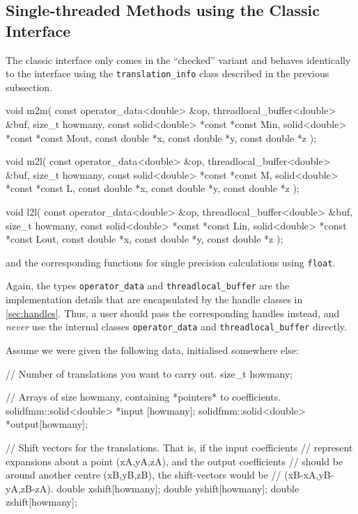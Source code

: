 \documentclass{scrbook}
\begin{document}
\subsection{Single-threaded Methods using the Classic Interface}
The classic interface only comes in the \enquote{checked} variant and behaves
identically to the interface using the \lstinline|translation_info| class
described in the previous subsection.
\begin{cppcode*}
void m2m( const operator_data<double> &op, threadlocal_buffer<double> &buf, 
          size_t howmany, const solid<double> *const *const Min,
                                solid<double> *const *const Mout,
          const double *x, const double *y, const double *z );

void m2l( const operator_data<double> &op, threadlocal_buffer<double> &buf, 
          size_t howmany, const solid<double> *const *const M,
                                solid<double> *const *const L,
          const double *x, const double *y, const double *z );


void l2l( const operator_data<double> &op, threadlocal_buffer<double> &buf, 
          size_t howmany, const solid<double> *const *const Lin,
                                solid<double> *const *const Lout,
          const double *x, const double *y, const double *z );

\end{cppcode*}
and the corresponding functions for single precision calculations using
\lstinline[style=cpp]|float|.

Again, the types \lstinline|operator_data| and \lstinline|threadlocal_buffer|
are the implementation details that are encapsulated by the handle classes in
\cref{sec:handles}. Thus, a user should pass the corresponding handles instead,
and \emph{never} use the internal classes \lstinline|operator_data| and
\lstinline|threadlocal_buffer| directly.

Assume we were given the following data, initialised somewhere else:
\begin{cppcode*}
// Number of translations you want to carry out.
size_t howmany;

// Arrays of size howmany, containing *pointers* to coefficients.
solidfmm::solid<double> *input [howmany];   
solidfmm::solid<double> *output[howmany];  

// Shift vectors for the translations. That is, if the input coefficients
// represent expansions about a point (xA,yA,zA), and the output coefficients
// should be around another centre (xB,yB,zB), the shift-vectors would be
// (xB-xA,yB-yA,zB-zA).
double xshift[howmany]; 
double yshift[howmany];
double zshift[howmany];
\end{cppcode*}
\end{document}

